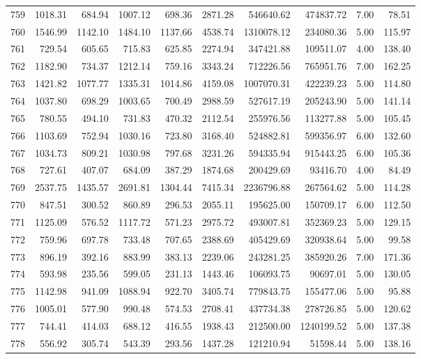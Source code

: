 \begin{tabular}{lrrrrrrrrr}
759 & 1018.31 & 684.94 & 1007.12 & 698.36 & 2871.28 & 546640.62 & 474837.72 & 7.00 & 78.51 \\
760 & 1546.99 & 1142.10 & 1484.10 & 1137.66 & 4538.74 & 1310078.12 & 234080.36 & 5.00 & 115.97 \\
761 & 729.54 & 605.65 & 715.83 & 625.85 & 2274.94 & 347421.88 & 109511.07 & 4.00 & 138.40 \\
762 & 1182.90 & 734.37 & 1212.14 & 759.16 & 3343.24 & 712226.56 & 765951.76 & 7.00 & 162.25 \\
763 & 1421.82 & 1077.77 & 1335.31 & 1014.86 & 4159.08 & 1007070.31 & 422239.23 & 5.00 & 114.80 \\
764 & 1037.80 & 698.29 & 1003.65 & 700.49 & 2988.59 & 527617.19 & 205243.90 & 5.00 & 141.14 \\
765 & 780.55 & 494.10 & 731.83 & 470.32 & 2112.54 & 255976.56 & 113277.88 & 5.00 & 105.45 \\
766 & 1103.69 & 752.94 & 1030.16 & 723.80 & 3168.40 & 524882.81 & 599356.97 & 6.00 & 132.60 \\
767 & 1034.73 & 809.21 & 1030.98 & 797.68 & 3231.26 & 594335.94 & 915443.25 & 6.00 & 105.36 \\
768 & 727.61 & 407.07 & 684.09 & 387.29 & 1874.68 & 200429.69 & 93416.70 & 4.00 & 84.49 \\
769 & 2537.75 & 1435.57 & 2691.81 & 1304.44 & 7415.34 & 2236796.88 & 267564.62 & 5.00 & 114.28 \\
770 & 847.51 & 300.52 & 860.89 & 296.53 & 2055.11 & 195625.00 & 150709.17 & 6.00 & 112.50 \\
771 & 1125.09 & 576.52 & 1117.72 & 571.23 & 2975.72 & 493007.81 & 352369.23 & 5.00 & 129.15 \\
772 & 759.96 & 697.78 & 733.48 & 707.65 & 2388.69 & 405429.69 & 320938.64 & 5.00 & 99.58 \\
773 & 896.19 & 392.16 & 883.99 & 383.13 & 2239.06 & 243281.25 & 385920.26 & 7.00 & 171.36 \\
774 & 593.98 & 235.56 & 599.05 & 231.13 & 1443.46 & 106093.75 & 90697.01 & 5.00 & 130.05 \\
775 & 1142.98 & 941.09 & 1088.94 & 922.70 & 3405.74 & 779843.75 & 155477.06 & 5.00 & 95.88 \\
776 & 1005.01 & 577.90 & 990.48 & 574.53 & 2708.41 & 437734.38 & 278726.85 & 5.00 & 120.62 \\
777 & 744.41 & 414.03 & 688.12 & 416.55 & 1938.43 & 212500.00 & 1240199.52 & 5.00 & 137.38 \\
778 & 556.92 & 305.74 & 543.39 & 293.56 & 1437.28 & 121210.94 & 51598.44 & 5.00 & 138.16 \\

\end{tabular}
